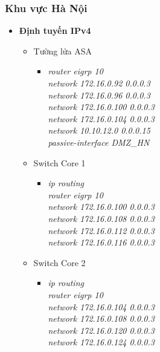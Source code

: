 \documentclass[12pt,a4paper]{report}
\begin{document}
\subsubsection{Khu vực Hà Nội}
\begin{itemize}
      \item \textbf{Định tuyến IPv4}
      
      \begin{itemize}
        \item Tường lửa ASA 
        \begin{itemize}
          \item \textit{router eigrp 10\\
network 172.16.0.92 0.0.0.3 \\
network 172.16.0.96 0.0.0.3 \\
network 172.16.0.100 0.0.0.3 \\
network 172.16.0.104 0.0.0.3\\
network 10.10.12.0 0.0.0.15\\
passive-interface DMZ\_HN\\}
        
        \end{itemize}
      
           \item Switch Core 1
        \begin{itemize}
         \item \textit{ip routing\\
router eigrp 10\\
network 172.16.0.100 0.0.0.3 \\
network 172.16.0.108 0.0.0.3 \\
network 172.16.0.112 0.0.0.3 \\
network 172.16.0.116 0.0.0.3 \\}
         
          \end{itemize}
             \item Switch Core 2
        \begin{itemize}
         \item \textit{ip routing\\
router eigrp 10\\
network 172.16.0.104 0.0.0.3 \\
network 172.16.0.108 0.0.0.3 \\
network 172.16.0.120 0.0.0.3 \\
network 172.16.0.124 0.0.0.3 \\}
         

\end{itemize}
\end{itemize}
\end{itemize}
\end{document}
